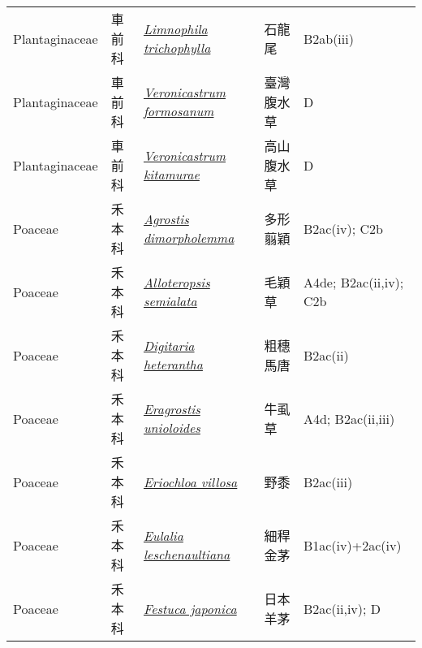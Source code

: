 {\begin{longtable}{p{2.5cm}p{2.5cm}p{4.5cm}p{2.5cm}p{3cm}}
    Plantaginaceae & 車前科 & \href{http://www.theplantlist.org/tpl1.1/search?q=Limnophila+trichophylla}{\textit{Limnophila trichophylla} } & 石龍尾 & B2ab(iii) \index{Limnophila@\textit{Limnophila}!trichophylla@\textit{trichophylla}}  \index{石龍尾} \\
    Plantaginaceae & 車前科 & \href{http://www.theplantlist.org/tpl1.1/search?q=Veronicastrum+formosanum}{\textit{Veronicastrum formosanum} } & 臺灣腹水草 & D \index{Veronicastrum@\textit{Veronicastrum}!formosanum@\textit{formosanum}}  \index{臺灣腹水草} \\
    Plantaginaceae & 車前科 & \href{http://www.theplantlist.org/tpl1.1/search?q=Veronicastrum+kitamurae}{\textit{Veronicastrum kitamurae} } & 高山腹水草 & D \index{Veronicastrum@\textit{Veronicastrum}!kitamurae@\textit{kitamurae}}  \index{高山腹水草} \\
    Poaceae & 禾本科 & \href{http://www.theplantlist.org/tpl1.1/search?q=Agrostis+dimorpholemma}{\textit{Agrostis dimorpholemma} } & 多形翦穎 & B2ac(iv); C2b \index{Agrostis@\textit{Agrostis}!dimorpholemma@\textit{dimorpholemma}}  \index{多形翦穎} \\
    Poaceae & 禾本科 & \href{http://www.theplantlist.org/tpl1.1/search?q=Alloteropsis+semialata}{\textit{Alloteropsis semialata} } & 毛穎草 & A4de; B2ac(ii,iv); C2b \index{Alloteropsis@\textit{Alloteropsis}!semialata@\textit{semialata}}  \index{毛穎草} \\
    Poaceae & 禾本科 & \href{http://www.theplantlist.org/tpl1.1/search?q=Digitaria+heterantha}{\textit{Digitaria heterantha} } & 粗穗馬唐 & B2ac(ii) \index{Digitaria@\textit{Digitaria}!heterantha@\textit{heterantha}}  \index{粗穗馬唐} \\
    Poaceae & 禾本科 & \href{http://www.theplantlist.org/tpl1.1/search?q=Eragrostis+unioloides}{\textit{Eragrostis unioloides} } & 牛虱草 & A4d; B2ac(ii,iii) \index{Eragrostis@\textit{Eragrostis}!unioloides@\textit{unioloides}}  \index{牛虱草} \\
    Poaceae & 禾本科 & \href{http://www.theplantlist.org/tpl1.1/search?q=Eriochloa+villosa}{\textit{Eriochloa villosa} } & 野黍 & B2ac(iii) \index{Eriochloa@\textit{Eriochloa}!villosa@\textit{villosa}}  \index{野黍} \\
    Poaceae & 禾本科 & \href{http://www.theplantlist.org/tpl1.1/search?q=Eulalia+leschenaultiana}{\textit{Eulalia leschenaultiana} } & 細稈金茅 & B1ac(iv)+2ac(iv) \index{Eulalia@\textit{Eulalia}!leschenaultiana@\textit{leschenaultiana}}  \index{細稈金茅} \\
    Poaceae & 禾本科 & \href{http://www.theplantlist.org/tpl1.1/search?q=Festuca+japonica}{\textit{Festuca japonica} } & 日本羊茅 & B2ac(ii,iv); D \index{Festuca@\textit{Festuca}!japonica@\textit{japonica}}  \index{日本羊茅} \\

\end{longtable}}
